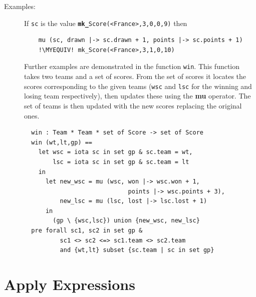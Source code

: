 \documentclass{overturerepchap}
\newcommand{\MYEQUIV}{$\equiv$}
\newcommand{\keyw}[1]{{\bf\ttfamily #1}}
\begin{document}
\begin{description}
\item[Examples:] If \texttt{sc} is the value \texttt{\keyw{mk\_}Score(<France>,3,0,0,9)} then
  \begin{lstlisting}
    mu (sc, drawn |-> sc.drawn + 1, points |-> sc.points + 1)
    !\MYEQUIV! mk_Score(<France>,3,1,0,10)
  \end{lstlisting}
  Further examples are demonstrated in the function \texttt{win}. This
  function takes two teams and a set of scores. From the set of scores
  it locates the scores corresponding to the given teams (\texttt{wsc}
  and \texttt{lsc} for the winning and losing team respectively), then
  updates these using the \keyw{mu} operator. The set of teams is then
  updated with the new scores replacing the original ones.
  \begin{lstlisting}
  win : Team * Team * set of Score -> set of Score
  win (wt,lt,gp) ==
    let wsc = iota sc in set gp & sc.team = wt,
        lsc = iota sc in set gp & sc.team = lt
    in 
      let new_wsc = mu (wsc, won |-> wsc.won + 1,
                             points |-> wsc.points + 3),
          new_lsc = mu (lsc, lost |-> lsc.lost + 1)
      in
        (gp \ {wsc,lsc}) union {new_wsc, new_lsc}
  pre forall sc1, sc2 in set gp &
          sc1 <> sc2 <=> sc1.team <> sc2.team
          and {wt,lt} subset {sc.team | sc in set gp}
  \end{lstlisting}

\end{description}

\section{Apply Expressions}\label{app-expr}
\end{document}
